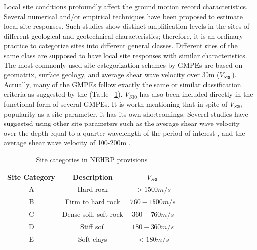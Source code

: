 Local site conditions profoundly affect the ground motion record
characteristics. Several numerical and/or empirical techniques have
been proposed to estimate local site responses. Such studies show
distinct amplification levels in the sites of different geological
and geotechnical characteristics; therefore, it is an ordinary
practice to categorize sites into different general classes.
Different sites of the same class are supposed to have local site
responses with similar characteristics. The most commonly used site
categorization schemes by GMPEs are based on geomatrix, surface
geology, and average shear wave velocity over 30m ($V_{S30}$).
Actually, many of the GMPEs follow exactly the same or similar
classification criteria as suggested by the \citet{eqrm_NEHRP00}
(Table ~\ref{NEHRP}). $V_{S30}$ has also been included directly in
the functional form of several GMPEs. It is worth mentioning that in
spite of $V_{S30}$ popularity as a site parameter, it has its own
shortcomings. Several studies have suggested using other site
parameters such as the average shear wave velocity over the depth
equal to a quarter-wavelength of the period of interest
\citep{eqrm_Boore91}, and the average shear wave velocity of
100-200m \citep{eqrm_Lee95}.
\begin{table}[!t]
\renewcommand{\arraystretch}{1.3}
\caption{Site categories in NEHRP provisions} \label{NEHRP}
\centering
\begin{tabular}{|c|c|c|}
\hline
Site Category & Description & $V_{S30}$\\
\hline
A & Hard rock & $>1500 m/s$\\
\hline
B & Firm to hard rock & $760-1500 m/s$\\
\hline
C & Dense soil, soft rock & $360-760 m/s$\\
\hline
D & Stiff soil & $180-360 m/s$\\
\hline
E & Soft clays & $<180 m/s$\\
\hline
\end{tabular}
\end{table}

